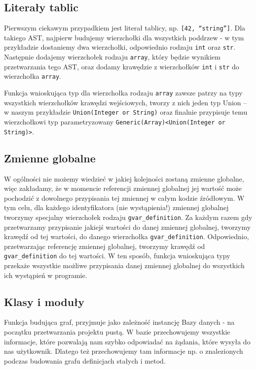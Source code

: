 \documentclass[declaration,shortabstract]{iithesis}
\begin{document}
\subsection{Literały tablic}

Pierwszym ciekawym przypadkiem jest literał tablicy, np. \texttt{[42, ``string'']}. Dla takiego AST, najpierw budujemy wierzchołki dla wszystkich poddrzew - w tym przykładzie dostaniemy dwa wierzchołki, odpowiednio rodzaju \texttt{int} oraz \texttt{str}. Następnie dodajemy wierzchołek rodzaju \texttt{array}, który będzie wynikiem przetwarzania tego AST, oraz dodamy krawędzie z wierzchołków \texttt{int} i \texttt{str} do wierzchołka \texttt{array}.

Funkcja wnioskująca typ dla wierzchołka rodzaju \texttt{array} zawsze patrzy na typy wszystkich wierzchołków krawędzi wejściowych, tworzy z nich jeden typ Union -- w naszym przykładzie \texttt{Union(Integer or String)} oraz finalnie przypisuje temu wierzchołkowi typ parametryzowany \texttt{Generic(Array)<Union(Integer or String)>}.

\subsection{Zmienne globalne}

W ogólności nie możemy wiedzieć w jakiej kolejności zostaną zmienne globalne, więc zakładamy, że w momencie referencji zmiennej globalnej jej wartość może pochodzić z dowolnego przypisania tej zmiennej w całym kodzie źródłowym. W tym celu, dla każdego identyfikatora (nie wystąpienia!) zmiennej globalnej tworzymy specjalny wierzchołek rodzaju \texttt{gvar\_definition}. Za każdym razem gdy przetwarzamy przypisanie jakiejś wartości do danej zmiennej globalnej, tworzymy krawędź od tej wartości, do danego wierzchołka \texttt{gvar\_definition}. Odpowiednio, przetwarzając referencję zmiennej globalnej, tworzymy krawędź od \texttt{gvar\_definition} do tej wartości. W ten sposób, funkcja wnioskująca typy przekaże wszystkie możliwe przypisania danej zmiennej globalnej do wszystkich ich wystąpień w programie.

\subsection{Klasy i moduły}

Funkcja budująca graf, przyjmuje jako zależność instancję Bazy danych - na początku przetwarzania projektu pustą. W bazie przechowujemy wszystkie informacje, które pozwalają nam szybko odpowiadać na żądania, które wysyła do nas użytkownik. Dlatego też przechowujemy tam informacje np. o znalezionych podczas budowania grafu definicjach stałych i metod.
\end{document}
